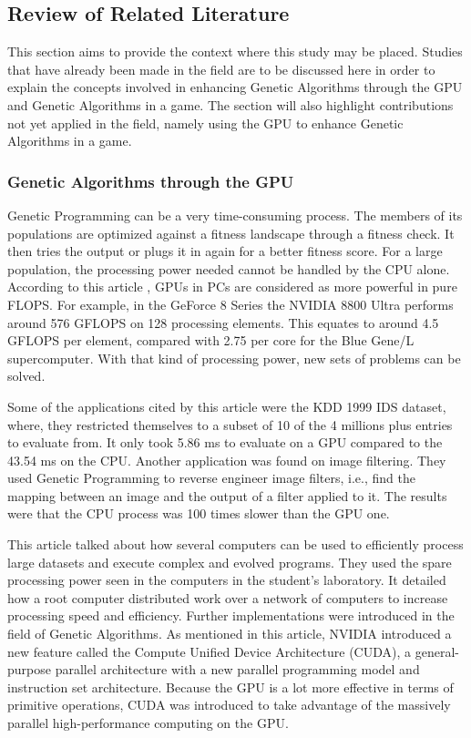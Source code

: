 \subsection*{Review of Related Literature}
	This section aims to provide the context where this study may be placed. 
	Studies that have already been made in the field are to be discussed here in order to 
	explain the concepts involved in enhancing Genetic Algorithms through the GPU and 
	Genetic Algorithms in a game. The section will also highlight contributions not yet 
	applied in the field, namely using the GPU to enhance Genetic Algorithms in a game.

	
\subsubsection*{Genetic Algorithms through the GPU}

	Genetic Programming can be a very time-consuming process.  The members of its populations are optimized against a fitness landscape through a fitness check.  
	It then tries the output or plugs it in again for a better fitness score. For a large population, the processing power needed cannot be handled by the CPU alone.  
	According to this article , GPUs in PCs are considered as more powerful in pure FLOPS\cite{Banzhaf09}.  For example, in the GeForce 8 Series the NVIDIA 8800 Ultra performs around 576 GFLOPS 
	on 128 processing elements.  This equates to around 4.5 GFLOPS per element, compared with 2.75 per core for the Blue Gene/L supercomputer.  With that kind of processing power, 
	new sets of problems can be solved.  

	Some of the applications cited by this article were the KDD 1999 IDS dataset, where, they restricted themselves to a subset of 10%
	of the 4 millions plus entries to evaluate from\cite{Banzhaf09}.  It only took 5.86 ms to evaluate on a GPU compared to the 43.54 ms on the CPU.  Another application was found on image filtering.  
	They used Genetic Programming to reverse engineer image filters, i.e., find the mapping between an image and the output of a filter applied to it.  The results were that the CPU process 
	was 100 times slower than the GPU one.  

	This article talked about how several computers can be used to efficiently process large datasets and execute complex and evolved programs\cite{Harding09}.  
	They used the spare processing power seen in the computers in the student's laboratory.  It detailed how a root computer distributed work over a network of computers to increase processing speed and efficiency.
	Further implementations were introduced in the field of Genetic Algorithms.  As mentioned in this article, NVIDIA introduced a new feature called the Compute Unified Device Architecture (CUDA), 
	a general-purpose parallel architecture with a new parallel programming model and instruction set architecture\cite{Zhang09}.  Because the GPU is a lot more effective in terms of primitive operations, 
	CUDA was introduced to take advantage of the massively parallel high-performance computing on the GPU.  

